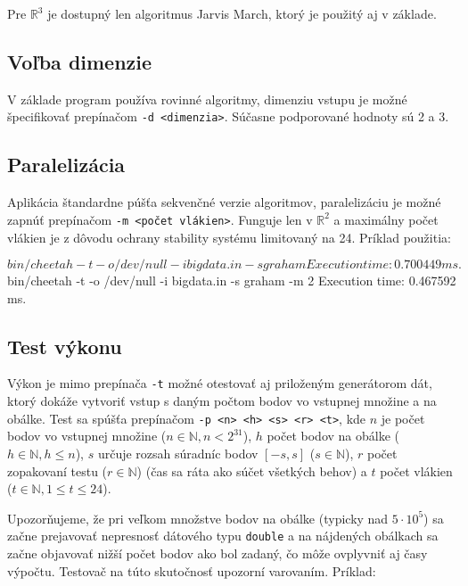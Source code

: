 \documentclass[a4paper, 12pt, slovak]{article}
\begin{document}
Pre $\mathbb{R}^3$ je dostupný len algoritmus Jarvis March, ktorý je použitý aj v 
základe.

\subsection{Voľba dimenzie}
V základe program používa rovinné algoritmy, dimenziu vstupu je možné špecifikovať 
prepínačom \texttt{-d <dimenzia>}. Súčasne podporované hodnoty sú 2 a 3.

\subsection{Paralelizácia}
Aplikácia štandardne púšťa sekvenčné verzie algoritmov, paralelizáciu je možné 
zapnúť prepína\-čom \texttt{-m <počet vlákien>}. Funguje len v $\mathbb{R}^2$ a 
maximálny počet vlákien je z dôvodu ochrany stability systému limitovaný na 24. 
Príklad použitia:

\begin{c++}
$ bin/cheetah -t -o /dev/null -i bigdata.in -s graham
Execution time: 0.700449 ms.
$ bin/cheetah -t -o /dev/null -i bigdata.in -s graham -m 2
Execution time: 0.467592 ms.
\end{c++}

\subsection{Test výkonu}
Výkon je mimo prepínača \texttt{-t} možné otestovať aj priloženým generátorom dát, 
ktorý dokáže vytvoriť vstup s daným počtom bodov vo vstupnej množine a na obálke. 
Test sa spúšťa prepínačom \texttt{-p <n> <h> <s> <r> <t>}, kde $n$ je počet bodov vo 
vstupnej množine ($n \in \mathbb{N}, n < 2^{31}$), $h$ počet bodov na obálke ($h 
\in \mathbb{N}, h \leq n$), $s$ určuje rozsah súradníc bodov $[-s, s]$ ($s \in 
\mathbb{N}$), $r$ počet zopakovaní testu ($r \in \mathbb{N}$) (čas sa ráta ako súčet 
všetkých behov) a $t$ počet vlákien ($t \in \mathbb{N}, 1 \leq t \leq 24$).

Upozorňujeme, že pri veľkom množstve bodov na obálke (typicky nad $5\cdot10^5$) sa 
začne prejavovať nepresnosť dátového typu \texttt{double} a na nájdených obálkach 
sa začne objavovať nižší počet bodov ako bol zadaný, čo môže ovplyvniť aj časy 
výpočtu. Testovač na túto skutočnosť upozorní varovaním. Príklad:

\end{document}
